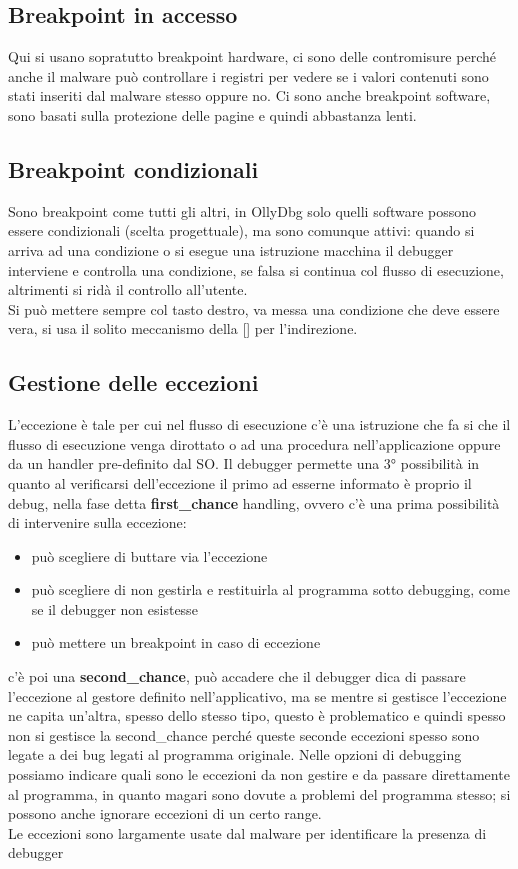 \documentclass[12pt, oneside]{extbook}
\begin{document}
\subsection{Breakpoint in accesso}
Qui si usano sopratutto breakpoint hardware, ci sono delle contromisure perché anche il malware può controllare i registri per vedere se i valori contenuti sono stati inseriti dal malware stesso oppure no. Ci sono anche breakpoint software, sono basati sulla protezione delle pagine e quindi abbastanza lenti.
\subsection{Breakpoint condizionali}
Sono breakpoint come tutti gli altri, in OllyDbg solo quelli software possono essere condizionali (scelta progettuale), ma sono comunque attivi: quando si arriva ad una condizione o si esegue una istruzione macchina il debugger interviene e controlla una condizione, se falsa si continua col flusso di esecuzione, altrimenti si ridà il controllo all'utente.\\ Si può mettere sempre col tasto destro, va messa una condizione che deve essere vera, si usa il solito meccanismo della [] per l'indirezione.
\subsection{Gestione delle eccezioni}
L'eccezione è tale per cui nel flusso di esecuzione c'è una istruzione che fa si che il flusso di esecuzione venga dirottato o ad una procedura nell'applicazione oppure da un handler pre-definito dal SO. Il debugger permette una 3° possibilità in quanto al verificarsi dell'eccezione il primo ad esserne informato è proprio il debug, nella fase detta \textbf{first\_chance} handling, ovvero c'è una prima possibilità di intervenire sulla eccezione:
\begin{itemize}
\item può scegliere di buttare via l'eccezione
\item può scegliere di non gestirla e restituirla al programma sotto debugging, come se il debugger non esistesse
\item può mettere un breakpoint in caso di eccezione
\end{itemize}
c'è poi una \textbf{second\_chance}, può accadere che il debugger dica di passare l'eccezione al gestore definito nell'applicativo, ma se mentre si gestisce l'eccezione ne capita un'altra, spesso dello stesso tipo, questo è problematico e quindi spesso non si gestisce la second\_chance perché queste seconde eccezioni spesso sono legate a dei bug legati al programma originale. Nelle opzioni di debugging possiamo indicare quali sono le eccezioni da non gestire e da passare direttamente al programma, in quanto magari sono dovute a problemi del programma stesso; si possono anche ignorare eccezioni di un certo range.\\Le eccezioni sono largamente usate dal malware per identificare la presenza di debugger
\end{document}
